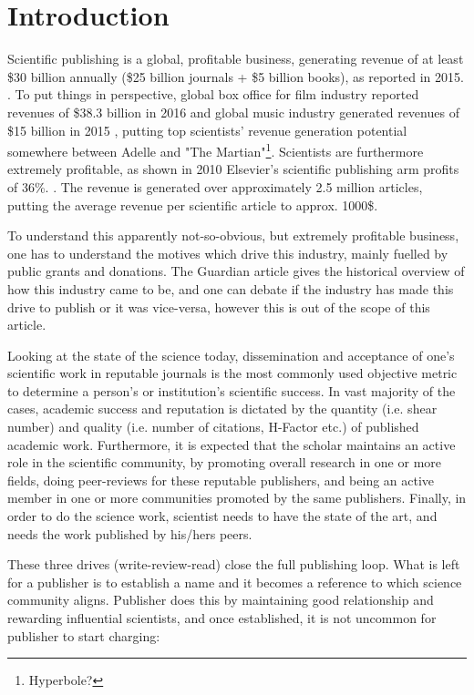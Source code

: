 \documentclass[12pt, a4paper]{article}
\begin{document}
\section{Introduction}

Scientific publishing is a global, profitable business, generating revenue of at least \$30 billion annually (\$25 billion journals + \$5 billion books), as reported in 2015. \cite{stm-1}. To put things in perspective, global box office for film industry reported revenues of \$38.3 billion in 2016 \cite{statista-1} and global music industry generated revenues of \$15 billion in 2015 \cite{ifpi-1}, putting top scientists' revenue generation potential somewhere between Adelle and "The Martian"\footnote{Hyperbole?}. Scientists are furthermore extremely profitable, as shown in 2010 Elsevier's scientific publishing arm profits of 36\%. \cite{guardian-1}. The revenue is generated over approximately 2.5 million articles, putting the average revenue per scientific article to approx. 1000\$.

To understand this apparently not-so-obvious, but extremely profitable business, one has to understand the motives which drive this industry, mainly fuelled by public grants and donations. The Guardian\cite{guardian-1} article gives the historical overview of how this industry came to be, and one can debate if the industry has made this drive to publish or it was vice-versa, however this is out of the scope of this article. 

Looking at the state of the science today, dissemination and acceptance of one's scientific work in reputable journals is the most commonly used objective metric to determine a person's or institution's scientific success. In vast majority of the cases, academic success and reputation is dictated by the quantity (i.e. shear number) and quality (i.e. number of citations, H-Factor etc.) of published academic work. 
Furthermore, it is expected that the scholar maintains an active role in the scientific community, by promoting overall research in one or more fields, doing peer-reviews for these reputable publishers, and being an active member in one or more communities promoted by the same publishers. Finally, in order to do the science work, scientist needs to have the state of the art, and needs the work published by his/hers peers.

These three drives (write-review-read) close the full publishing loop. What is left for a publisher is to establish a name and it becomes a reference to which science community aligns. Publisher does this by maintaining good relationship and rewarding influential scientists, and once established, it is not uncommon for publisher to start charging:
\end{document}
